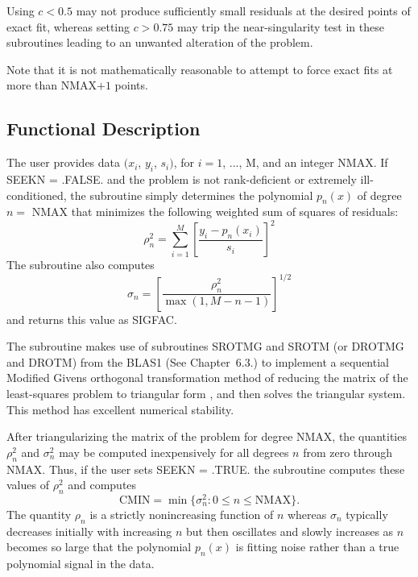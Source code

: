 \documentclass[twoside]{MATH77}
\begin{document}
Using $c < 0.5$ may not produce sufficiently small residuals at the desired
points of exact fit, whereas setting $c > 0.75$ may trip the
near-singularity test in these subroutines leading to an unwanted alteration
of the problem.

Note that it is not mathematically reasonable to attempt to force exact fits
at more than NMAX$+1$ points.

\subsection{Functional Description}

The user provides data $(x_i$, $y_i$, $s_i)$, for $i=1$, ..., M, and an
integer NMAX. If SEEKN = .FALSE. and the problem is not rank-deficient or
extremely ill-conditioned, the subroutine simply determines the polynomial $%
p_n(x)$ of degree $n=$ NMAX that minimizes the following weighted sum of
squares of residuals:
\begin{equation*}
\rho _n^2=\sum_{i=1}^M\left[ \frac{y_i-p_n(x_i)}{s_i}\right] ^2
\end{equation*}
The subroutine also computes%
\begin{equation*}
\sigma _n=\left[ \frac{\rho _n^2}{\max (1,M-n-1)}\right] ^{1/2}
\end{equation*}
and returns this value as SIGFAC.

The subroutine makes use of subroutines SROTMG and SROTM (or DROTMG and
DROTM) from the BLAS1 (See Chapter~6.3.) to implement a sequential
Modified Givens orthogonal transformation method of reducing the matrix of
the least-squares problem to triangular form \cite{Lawson:1974:SLS}, and
then solves the triangular system.  This method has excellent numerical
stability.

After triangularizing the matrix of the problem for degree NMAX, the
quantities $\rho ^2_n$ and $\sigma ^2_n$ may be computed inexpensively for
all degrees $n$ from zero through NMAX. Thus, if the user sets SEEKN =
.TRUE. the subroutine computes these values of $\rho ^2_n$ and computes
\begin{equation*}
\text{CMIN} = \min \{\sigma ^2_n : 0 \leq n \leq \text{NMAX}\}.
\end{equation*}
The quantity $\rho _n$ is a strictly nonincreasing function of $n$ whereas $%
\sigma _n$ typically decreases initially with increasing $n$ but then
oscillates and slowly increases as $n$ becomes so large that the polynomial $%
p_n(x)$ is fitting noise rather than a true polynomial signal in the data.
\end{document}
